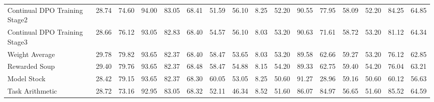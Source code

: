 \begin{table*}
{\begin{tabular}{lcccccccc|c|cc|cccc}
            Continual DPO Training Stage2     & 28.74                                     & 74.60            & 94.00                                      & 83.05                                  & 68.41                                 & 51.59                                   & 56.10                         & 8.25     & 52.20           & 90.55           & 77.95       & 58.09 & 52.20 & 84.25 & 64.85             \\
            Continual DPO Training Stage3     & 28.66                                     & 76.12            & 93.05                                      & 82.83                                  & 68.40                                 & 54.57                                   & 56.10                         & 8.03     & 53.20           & 90.63           & 71.61       & 58.72 & 53.20 & 81.12 & 64.34             \\ \midrule
            Weight Average                    & 29.78                                     & 79.82            & 93.65                                      & 82.37                                  & 68.40                                 & 58.47                                   & 53.65                         & 8.03     & 53.20           & 89.58           & 62.66       & 59.27 & 53.20 & 76.12 & 62.85             \\
            Rewarded Soup                     & 29.40                                     & 79.76            & 93.65                                      & 82.37                                  & 68.48                                 & 58.47                                   & 54.88                         & 8.15     & 54.20           & 89.33           & 62.75       & 59.40 & 54.20 & 76.04 & 63.21             \\
            Model Stock                       & 28.42                                     & 79.15            & 93.65                                      & 82.37                                  & 68.30                                 & 60.05                                   & 53.05                         & 8.25     & 50.60           & 91.27           & 28.96       & 59.16 & 50.60 & 60.12 & 56.63             \\
            Task Arithmetic                   & 28.72                                     & 73.16            & 92.95                                      & 83.05                                  & 68.32                                 & 52.11                                   & 46.34                         & 8.52     & 51.60           & 86.07           & 84.97       & 56.65 & 51.60 & 85.52 & 64.59             \\

\end{tabular}}
\end{table*}
